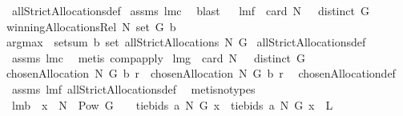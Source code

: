 \begin{isabellebody}
%
\endisadelimproof
%
\isatagproof
{}\isamarkupfalse%
\ allStrictAllocations{\isacharunderscore}def\isanewline
{}\isamarkupfalse%
\ assms\ lm{}{}c\ \isamarkupfalse%
\ blast%
\endisatagproof
{\isafoldproof}%
%
\isadelimproof
\ \isanewline
%
\endisadelimproof
\isanewline
{}\isamarkupfalse%
\ lm{}{}f{\isacharcolon}\ \ {\isachardoublequoteopen}card\ N\ {\isachargreater}\ {}{\isachardoublequoteclose}\ {\isachardoublequoteopen}distinct\ G{\isachardoublequoteclose}\ \ \isanewline
{\isachardoublequoteopen}winningAllocationsRel\ N\ {\isacharparenleft}set\ G{\isacharparenright}\ b\ {\isacharequal}\ \isanewline
{\isacharparenleft}argmax\ {\isasymcirc}\ setsum{\isacharparenright}\ b\ {\isacharparenleft}set\ {\isacharparenleft}allStrictAllocations\ N\ G{\isacharparenright}{\isacharparenright}{\isachardoublequoteclose}\isanewline
%
\isadelimproof
%
\endisadelimproof
%
\isatagproof
{}\isamarkupfalse%
\ allStrictAllocations{\isacharunderscore}def\isanewline
{}\isamarkupfalse%
\ assms\ lm{}{}c\ \isamarkupfalse%
\ {\isacharparenleft}metis\ comp{\isacharunderscore}apply{\isacharparenright}%
\endisatagproof
{\isafoldproof}%
%
\isadelimproof
\isanewline
%
\endisadelimproof
\isanewline
{}\isamarkupfalse%
\ lm{}{}g{\isacharcolon}\ \ {\isachardoublequoteopen}card\ N\ {\isachargreater}\ {}{\isachardoublequoteclose}\ {\isachardoublequoteopen}distinct\ G{\isachardoublequoteclose}\ \isanewline
{\isachardoublequoteopen}chosenAllocation{\isacharprime}\ N\ G\ b\ r\ {\isacharequal}\ chosenAllocation\ N\ G\ b\ r{\isachardoublequoteclose}\ \isanewline
%
\isadelimproof
%
\endisadelimproof
%
\isatagproof
{}\isamarkupfalse%
\ chosenAllocation{\isacharunderscore}def\ \isamarkupfalse%
\ assms\ lm{}{}f\ allStrictAllocations{\isacharunderscore}def\ \isamarkupfalse%
\ {\isacharparenleft}metis{\isacharparenleft}no{\isacharunderscore}types{\isacharparenright}{\isacharparenright}%
\endisatagproof
{\isafoldproof}%
%
\isadelimproof
\ \isanewline
%
\endisadelimproof
{}\isamarkupfalse%
\ lm{}{}b{\isacharcolon}\ \ {\isachardoublequoteopen}x\ {\isasymin}\ {\isacharparenleft}N\ {\isasymtimes}\ {\isacharparenleft}Pow\ G\ {\isacharminus}\ {\isacharbraceleft}{\isacharbraceleft}{\isacharbraceright}{\isacharbraceright}{\isacharparenright}{\isacharparenright}{\isachardoublequoteclose}\ \ {\isachardoublequoteopen}tiebids{\isacharprime}\ a\ N\ G\ x\ {\isacharequal}\ tiebids\ a\ N\ G\ x{\isachardoublequoteclose}\ {\isacharparenleft}\ {\isachardoublequoteopen}{\isacharquery}L{\isacharequal}{\isacharunderscore}{\isachardoublequoteclose}{\isacharparenright}\ \isanewline

\end{isabellebody}
